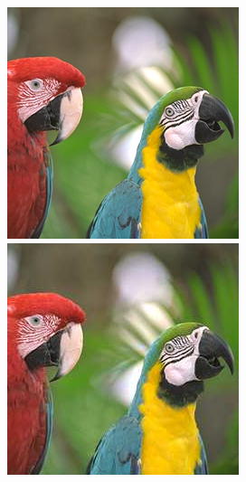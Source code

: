 \documentclass[a4paper,10pt]{ikelab-seminar}
\begin{document}
\begin{figure}[t]
   \centering
   \begin{minipage}{.45\hsize}
      \centering
      \includegraphics[width=.7\hsize]{figure/example-png.png}
   \end{minipage}
   \begin{minipage}{.45\hsize}
      \centering
      \includegraphics[width=.7\hsize]{figure/example-jpg.jpg}

\end{minipage}
\end{figure}
\end{document}
